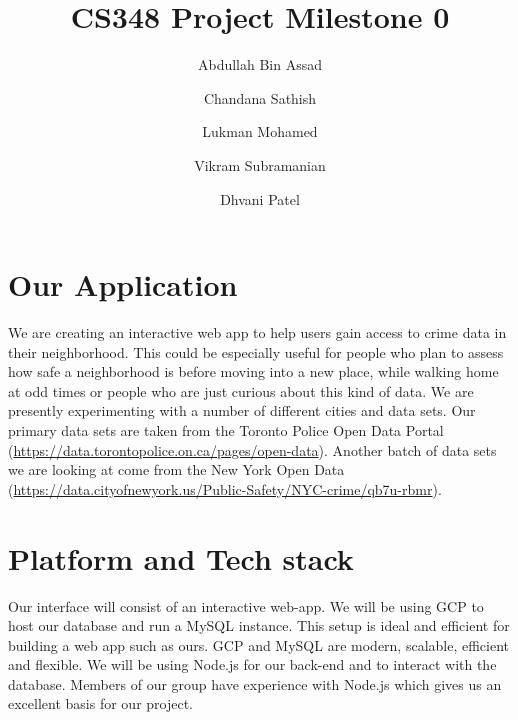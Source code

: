 \documentclass{article}
\title{CS348 Project Milestone 0}
\author{Abdullah Bin Assad\and Chandana Sathish \and Lukman Mohamed \and Vikram Subramanian \and Dhvani Patel}
\begin{document}
\maketitle

\section*{Our Application}
We are creating an interactive web app to help users gain access to crime data in their neighborhood. This could be especially useful for people who plan to assess how safe a neighborhood is before moving into a new place, while walking home at odd times or people who are just curious about this kind of data. We are presently experimenting with a number of different cities and data sets. Our primary data sets are taken from the Toronto Police Open Data Portal (\url{https://data.torontopolice.on.ca/pages/open-data}). Another batch of data sets we are looking at come from the New York Open Data (\url{https://data.cityofnewyork.us/Public-Safety/NYC-crime/qb7u-rbmr}). 
\section*{Platform and Tech stack}
Our interface will consist of an interactive web-app. We will be using GCP to host our database and run a MySQL instance. This setup is ideal and efficient for building a web app such as ours. GCP and MySQL are modern, scalable, efficient and flexible. We will be using Node.js for our back-end and to interact with the database. Members of our group have experience with Node.js which gives us an excellent basis for our project.
\end{document}
